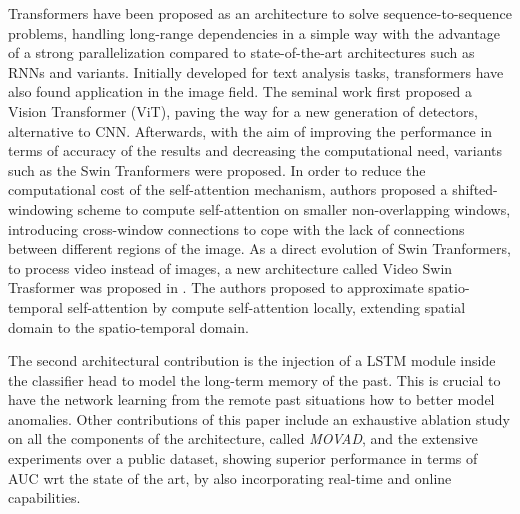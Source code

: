 Transformers \cite{vaswani2017attention} have been proposed as an architecture to solve sequence-to-sequence problems, handling long-range dependencies in a simple way with the advantage of a strong parallelization compared to state-of-the-art architectures such as RNNs and variants.
Initially developed for text analysis tasks, transformers have also found application in the image field.
The seminal work \cite{DBLP:conf/iclr/DosovitskiyB0WZ21} first proposed a Vision Transformer (ViT), paving the way for a new generation of detectors, alternative to CNN.
Afterwards, with the aim of improving the performance in terms of accuracy of the results and decreasing the computational need, variants such as the Swin Tranformers \cite{liu2021Swin} were proposed. In order to reduce the computational cost of the self-attention mechanism, authors proposed a shifted-windowing scheme to compute self-attention on smaller non-overlapping windows, introducing cross-window connections to cope with the lack of connections between different regions of the image.
As a direct evolution of Swin Tranformers, to process video instead of images, a new architecture called Video Swin Trasformer was proposed in \cite{liu_video_2022}. The authors proposed to approximate spatio-temporal self-attention by compute self-attention locally, extending spatial domain to the spatio-temporal domain.  

The second architectural contribution is the injection of a LSTM module inside the classifier head to model the long-term memory of the past. This is crucial to have the network learning from the remote past situations how to better model anomalies.
Other contributions of this paper include an exhaustive ablation study on all the components of the architecture, called \emph{MOVAD}, and the extensive experiments over a public dataset, showing superior performance in terms of AUC wrt the state of the art, by also incorporating real-time and online capabilities.